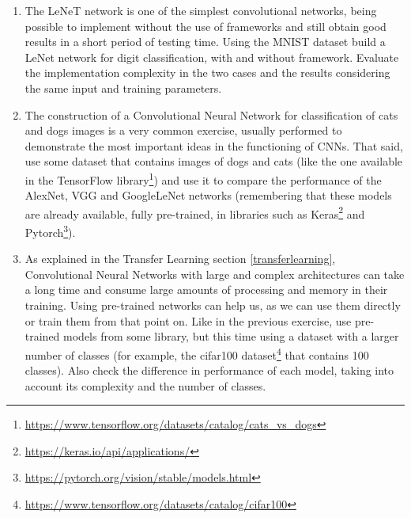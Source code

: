 \begin{enumerate}
\item \noindent The LeNeT network is one of the simplest convolutional networks, being possible to implement without the use of frameworks and still obtain good results in a short period of testing time. Using the MNIST dataset build a LeNet network for digit classification, with and without framework. Evaluate the implementation complexity in the two cases and the results considering the same input and training parameters.


\item The construction of a Convolutional Neural Network for classification of cats and dogs images is a very common exercise, usually performed to demonstrate the most important ideas in the functioning of CNNs. That said, use some dataset that contains images of dogs and cats (like the one available in the TensorFlow library\footnote{\url{https://www.tensorflow.org/datasets/catalog/cats_vs_dogs}}) and use it to compare the performance of the AlexNet, VGG and GoogleLeNet networks (remembering that these models are already available, fully pre-trained, in libraries such as Keras\footnote{\url{https://keras.io/api/applications/}} and Pytorch\footnote{\url{https://pytorch.org/vision/stable/models.html}}).


\item As explained in the Transfer Learning section \ref{transferlearning}, Convolutional Neural Networks with large and complex architectures can take a long time and consume large amounts of processing and memory in their training. Using pre-trained networks can help us, as we can use them directly or train them from that point on. Like in the previous exercise, use pre-trained models from some library, but this time using a dataset with a larger number of classes (for example, the cifar100 dataset\footnote{\url{https://www.tensorflow.org/datasets/catalog/cifar100}} that contains 100 classes). Also check the difference in performance of each model, taking into account its complexity and the number of classes.
\end{enumerate}